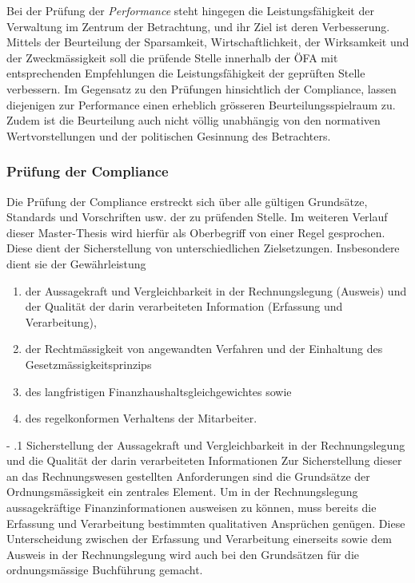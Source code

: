\documentclass[10pt]{article}
\makeatletter
\renewcommand\paragraph{\@startsection{paragraph}{3}{0mm}{-\baselineskip}{.1\baselineskip}{\normalfont\normalsize\bfseries}}
\renewcommand\paragraph{%
\@startsection{paragraph}{3}{0mm}%
{-\baselineskip}%
{.1\baselineskip}%
{\normalfont\normalsize\bfseries}}
\makeatother
\begin{document}
Bei der Prüfung der \textit{Performance} steht hingegen die Leistungsfähigkeit der Verwaltung im Zentrum der Betrachtung, und ihr Ziel ist deren Verbesserung. Mittels der Beurteilung der Sparsamkeit, Wirtschaftlichkeit, der Wirksamkeit und der Zweckmässigkeit soll die prüfende Stelle innerhalb der ÖFA mit entsprechenden Empfehlungen die Leistungsfähigkeit der geprüften Stelle verbessern. Im Gegensatz zu den Prüfungen hinsichtlich der Compliance, lassen diejenigen zur Performance einen erheblich grösseren Beurteilungsspielraum zu. Zudem ist die Beurteilung auch nicht völlig unabhängig von den normativen Wertvorstellungen und der politischen Gesinnung des Betrachters.

\subsubsection{Prüfung der Compliance}\label{subsubsec:pruefung_der_compliance}
Die Prüfung der Compliance erstreckt sich über alle gültigen Grundsätze, Standards und Vorschriften usw. der zu prüfenden Stelle. Im weiteren Verlauf dieser Master-Thesis wird hierfür als Oberbegriff von einer Regel gesprochen. Diese dient der Sicherstellung von unterschiedlichen Zielsetzungen. Insbesondere dient sie der Gewährleistung

\begin{enumerate}
    \item der Aussagekraft und Vergleichbarkeit in der Rechnungslegung (Ausweis) und der Qualität der darin verarbeiteten Information (Erfassung und Verarbeitung),

    \item der Rechtmässigkeit von angewandten Verfahren und der Einhaltung des Gesetzmässigkeitsprinzips

    \item des langfristigen Finanzhaushaltsgleichgewichtes sowie

    \item des regelkonformen Verhaltens der Mitarbeiter.

\end{enumerate}

\paragraph{Sicherstellung der Aussagekraft und Vergleichbarkeit in der Rechnungslegung und die Qualität der darin verarbeiteten Informationen}\label{para:sicherstellung_der_aussagekraft_und_vergleichbarkeit_in_der_rechnungslegung_und_die_qualitaet_der_darin_verarbeiteten_informationen}
Zur Sicherstellung dieser an das Rechnungswesen gestellten Anforderungen sind die Grundsätze der Ordnungsmässigkeit ein zentrales Element. Um in der Rechnungslegung aussagekräftige Finanzinformationen ausweisen zu können, muss bereits die Erfassung und Verarbeitung bestimmten qualitativen Ansprüchen genügen. Diese Unterscheidung zwischen der Erfassung und Verarbeitung einerseits sowie dem Ausweis in der Rechnungslegung wird auch bei den Grundsätzen für die ordnungsmässige Buchführung gemacht.
\end{document}
